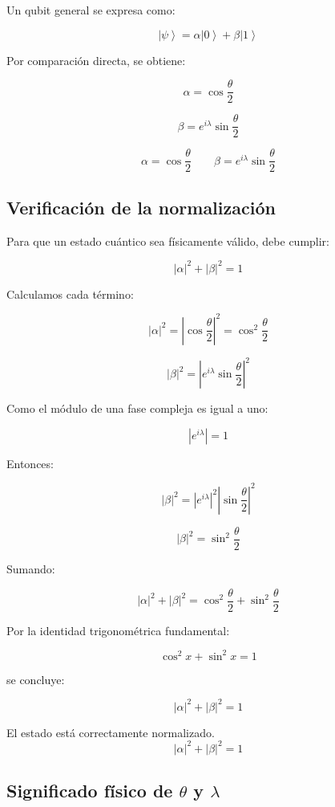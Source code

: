 \documentclass[12pt,a4paper]{article}
\newcommand{\ket}[1]{\left|#1\right\rangle}
\begin{document}
Un qubit general se expresa como:

\[
\ket{\psi}=\alpha\ket{0}+\beta\ket{1}
\]

Por comparación directa, se obtiene:

\[
\alpha=\cos\frac{\theta}{2}
\]

\[
\beta=e^{i\lambda}\sin\frac{\theta}{2}
\]

\begin{resultado}
\[
\boxed{\alpha=\cos\frac{\theta}{2}}
\qquad
\boxed{\beta=e^{i\lambda}\sin\frac{\theta}{2}}
\]
\end{resultado}

\subsection{Verificación de la normalización}

Para que un estado cuántico sea físicamente válido, debe cumplir:

\[
|\alpha|^2+|\beta|^2=1
\]

Calculamos cada término:

\[
|\alpha|^2=\left|\cos\frac{\theta}{2}\right|^2=\cos^2\frac{\theta}{2}
\]

\[
|\beta|^2=\left|e^{i\lambda}\sin\frac{\theta}{2}\right|^2
\]

Como el módulo de una fase compleja es igual a uno:

\[
|e^{i\lambda}|=1
\]

Entonces:

\[
|\beta|^2=|e^{i\lambda}|^2\left|\sin\frac{\theta}{2}\right|^2
\]

\[
|\beta|^2=\sin^2\frac{\theta}{2}
\]

Sumando:

\[
|\alpha|^2+|\beta|^2
=
\cos^2\frac{\theta}{2}
+
\sin^2\frac{\theta}{2}
\]

Por la identidad trigonométrica fundamental:

\[
\cos^2 x+\sin^2 x=1
\]

se concluye:

\[
|\alpha|^2+|\beta|^2=1
\]

\begin{resultado}
El estado está correctamente normalizado.
\[
\boxed{|\alpha|^2+|\beta|^2=1}
\]
\end{resultado}

\subsection{Significado físico de \texorpdfstring{$\theta$}{theta} y \texorpdfstring{$\lambda$}{lambda}}
\end{document}
